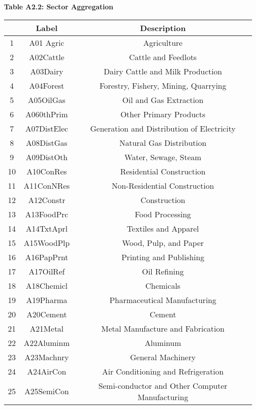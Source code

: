 \documentclass[12pt]{article}
\begin{document}
\newpage
\textbf{Table A2.2: Sector Aggregation}\\[5pt]
\begin{center}
\begin{footnotesize}
\begin{tabular}{|c|c|c|}
\hline & Label & Description \\
\hline 1 & A01 Agric & Agriculture \\
\hline 2 & A02Cattle & Cattle and Feedlots \\
\hline 3 & A03Dairy & Dairy Cattle and Milk Production \\
\hline 4 & A04Forest & Forestry, Fishery, Mining, Quarrying \\
\hline 5 & A05OilGas & Oil and Gas Extraction \\
\hline 6 & A060thPrim & Other Primary Products \\
\hline 7 & A07DistElec & Generation and Distribution of Electricity \\
\hline 8 & A08DistGas & Natural Gas Distribution \\
\hline 9 & A09DistOth & Water, Sewage, Steam \\
\hline 10 & A10ConRes & Residential Construction \\
\hline 11 & A11ConNRes & Non-Residential Construction \\
\hline 12 & A12Constr & Construction \\
\hline 13 & A13FoodPrc & Food Processing \\
\hline 14 & A14TxtAprl & Textiles and Apparel \\
\hline 15 & A15WoodPlp & Wood, Pulp, and Paper \\
\hline 16 & A16PapPrnt & Printing and Publishing \\
\hline 17 & A17OilRef & Oil Refining \\
\hline 18 & A18Chemicl & Chemicals \\
\hline 19 & A19Pharma & Pharmaceutical Manufacturing \\
\hline 20 & A20Cement & Cement \\
\hline 21 & A21Metal & Metal Manufacture and Fabrication \\
\hline 22 & A22Aluminm & Aluminum \\
\hline 23 & A23Machnry & General Machinery \\
\hline 24 & A24AirCon & Air Conditioning and Refrigeration \\
\hline 25 & A25SemiCon & Semi-conductor and Other Computer Manufacturing \\

\end{tabular}
\end{footnotesize}
\end{center}
\end{document}
